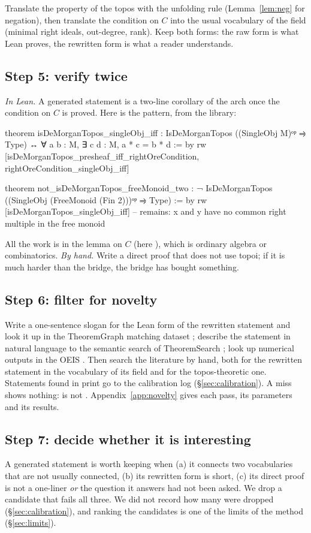Translate the property of the topos with the unfolding rule (Lemma~\ref{lem:neg} for negation), then translate the condition on $C$ into the usual vocabulary of the field (minimal right ideals, out-degree, rank). Keep both forms: the raw form is what Lean proves, the rewritten form is what a reader understands.

\subsection{Step 5: verify twice}

\emph{In Lean.} A generated statement is a two-line corollary of the arch once the condition on $C$ is proved. Here is the pattern, from the library:
\begin{leancode}
theorem isDeMorganTopos_singleObj_iff :
    IsDeMorganTopos ((SingleObj M)ᵒᵖ ⥤ Type) ↔ ∀ a b : M, ∃ c d : M, a * c = b * d := by
  rw [isDeMorganTopos_presheaf_iff_rightOreCondition, rightOreCondition_singleObj_iff]

theorem not_isDeMorganTopos_freeMonoid_two :
    ¬ IsDeMorganTopos ((SingleObj (FreeMonoid (Fin 2)))ᵒᵖ ⥤ Type) := by
  rw [isDeMorganTopos_singleObj_iff]
  -- remains: x and y have no common right multiple in the free monoid
\end{leancode}
All the work is in the lemma on $C$ (here ), which is ordinary algebra or combinatorics. \emph{By hand.} Write a direct proof that does not use topoi; if it is much harder than the bridge, the bridge has bought something.

\subsection{Step 6: filter for novelty}

Write a one-sentence slogan for the Lean form of the rewritten statement and look it up in the TheoremGraph matching dataset \cite{theoremgraph-matching}; describe the statement in natural language to the semantic search of TheoremSearch \cite{theoremsearch}; look up numerical outputs in the OEIS \cite{oeis}. Then search the literature by hand, both for the rewritten statement in the vocabulary of its field and for the topos-theoretic one. Statements found in print go to the calibration log (\S\ref{sec:calibration}). A miss shows nothing:  is not . Appendix~\ref{app:novelty} gives each pass, its parameters and its results.

\subsection{Step 7: decide whether it is interesting}

A generated statement is worth keeping when (a) it connects two vocabularies that are not usually connected, (b) its rewritten form is short, (c) its direct proof is not a one-liner \emph{or} the question it answers had not been asked. We drop a candidate that fails all three. We did not record how many were dropped (\S\ref{sec:calibration}), and ranking the candidates is one of the limits of the method (\S\ref{sec:limits}).
